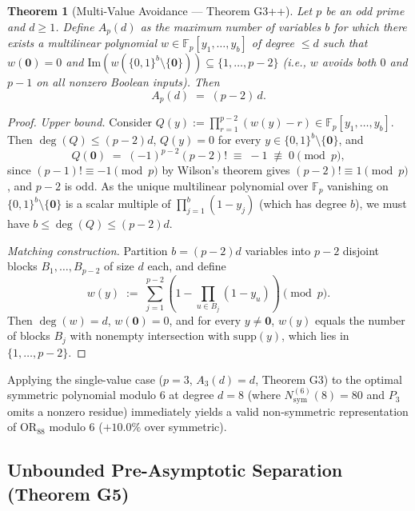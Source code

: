 \documentclass[11pt,a4paper]{article}
\newtheorem{theorem}{Theorem}[section]
\theoremstyle{definition}
\newcommand{\F}{\mathbb{F}}
\newcommand{\OR}{\mathrm{OR}}
\newcommand{\Nsym}{N_{\mathrm{sym}}}
\newcommand{\supp}{\mathrm{supp}}
\newcommand{\ImSet}{\mathrm{Im}}
\begin{document}
\begin{theorem}[Multi-Value Avoidance --- Theorem G3++]
\label{thm:g3pp}
Let $p$ be an odd prime and $d \ge 1$. Define $A_p(d)$ as the maximum number of variables $b$ for which there exists a multilinear polynomial $w \in \F_p[y_1,\dots,y_b]$ of degree $\le d$ such that $w(\mathbf{0}) = 0$ and $\ImSet(w(\{0,1\}^b \setminus \{\mathbf{0}\})) \subseteq \{1,\dots,p-2\}$ (i.e., $w$ avoids both $0$ and $p-1$ on all nonzero Boolean inputs). Then
\[
  A_p(d) \;=\; (p - 2)\, d.
\]
\end{theorem}

\begin{proof}
\emph{Upper bound.} Consider $Q(y) := \prod_{r=1}^{p-2} (w(y) - r) \in \F_p[y_1,\dots,y_b]$. Then $\deg(Q) \le (p-2)d$, $Q(y) = 0$ for every $y \in \{0,1\}^b \setminus \{\mathbf{0}\}$, and
\[
  Q(\mathbf{0}) \;=\; (-1)^{p-2}(p-2)! \;\equiv\; -1 \;\not\equiv\; 0 \pmod p,
\]
since $(p-1)! \equiv -1 \pmod p$ by Wilson's theorem gives $(p-2)! \equiv 1 \pmod p$, and $p - 2$ is odd. As the unique multilinear polynomial over $\F_p$ vanishing on $\{0,1\}^b \setminus \{\mathbf{0}\}$ is a scalar multiple of $\prod_{j=1}^b (1 - y_j)$ (which has degree $b$), we must have $b \le \deg(Q) \le (p-2)d$.

\emph{Matching construction.} Partition $b = (p-2)d$ variables into $p-2$ disjoint blocks $B_1,\dots,B_{p-2}$ of size $d$ each, and define
\[
  w(y) \;:=\; \sum_{j=1}^{p-2} \left(1 - \prod_{u \in B_j} (1 - y_u)\right) \pmod p.
\]
Then $\deg(w) = d$, $w(\mathbf{0}) = 0$, and for every $y \neq \mathbf{0}$, $w(y)$ equals the number of blocks $B_j$ with nonempty intersection with $\supp(y)$, which lies in $\{1,\dots,p-2\}$.
\end{proof}

Applying the single-value case ($p=3$, $A_3(d) = d$, Theorem G3) to the optimal symmetric polynomial modulo $6$ at degree $d = 8$ (where $\Nsym^{(6)}(8) = 80$ and $P_3$ omits a nonzero residue) immediately yields a valid non-symmetric representation of $\OR_{88}$ modulo $6$ ($+10.0\%$ over symmetric).

\subsection{Unbounded Pre-Asymptotic Separation (Theorem G5)}
\end{document}
